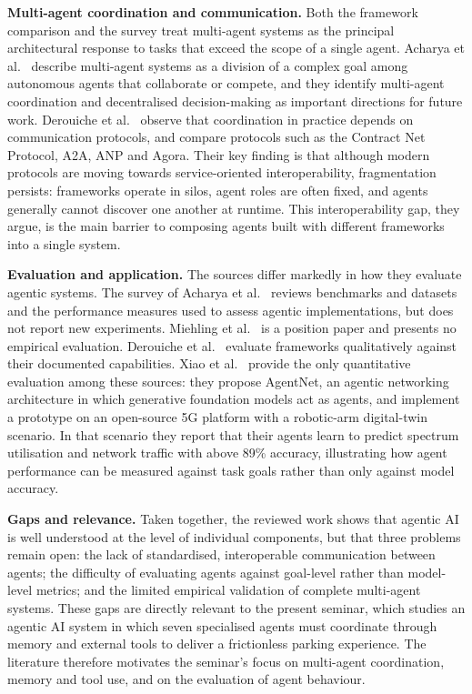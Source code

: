 \documentclass[12pt,a4paper]{report}
\begin{document}
\noindent\textbf{Multi-agent coordination and communication.}
Both the framework comparison and the survey treat multi-agent systems as the principal architectural response to tasks that exceed the scope of a single agent. Acharya et al.~\cite{ref2} describe multi-agent systems as a division of a complex goal among autonomous agents that collaborate or compete, and they identify multi-agent coordination and decentralised decision-making as important directions for future work. Derouiche et al.~\cite{ref8} observe that coordination in practice depends on communication protocols, and compare protocols such as the Contract Net Protocol, A2A, ANP and Agora. Their key finding is that although modern protocols are moving towards service-oriented interoperability, fragmentation persists: frameworks operate in silos, agent roles are often fixed, and agents generally cannot discover one another at runtime. This interoperability gap, they argue, is the main barrier to composing agents built with different frameworks into a single system.

\noindent\textbf{Evaluation and application.}
The sources differ markedly in how they evaluate agentic systems. The survey of Acharya et al.~\cite{ref2} reviews benchmarks and datasets and the performance measures used to assess agentic implementations, but does not report new experiments. Miehling et al.~\cite{ref7} is a position paper and presents no empirical evaluation. Derouiche et al.~\cite{ref8} evaluate frameworks qualitatively against their documented capabilities. Xiao et al.~\cite{ref3} provide the only quantitative evaluation among these sources: they propose AgentNet, an agentic networking architecture in which generative foundation models act as agents, and implement a prototype on an open-source 5G platform with a robotic-arm digital-twin scenario. In that scenario they report that their agents learn to predict spectrum utilisation and network traffic with above 89\% accuracy, illustrating how agent performance can be measured against task goals rather than only against model accuracy.

\noindent\textbf{Gaps and relevance.}
Taken together, the reviewed work shows that agentic AI is well understood at the level of individual components, but that three problems remain open: the lack of standardised, interoperable communication between agents; the difficulty of evaluating agents against goal-level rather than model-level metrics; and the limited empirical validation of complete multi-agent systems. These gaps are directly relevant to the present seminar, which studies an agentic AI system in which seven specialised agents must coordinate through memory and external tools to deliver a frictionless parking experience. The literature therefore motivates the seminar's focus on multi-agent coordination, memory and tool use, and on the evaluation of agent behaviour.
\end{document}
